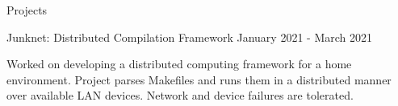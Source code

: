\documentclass{resume} %
\begin{document}
\begin{resumeSection}{Projects}
\begin{resumeSubsection}{Junknet: Distributed Compilation Framework}
	{January 2021 - March 2021}{}{}
\item Worked on developing a distributed computing framework for a home
	environment. Project parses Makefiles and runs them in a distributed
	manner over available LAN devices. Network and device failures are
	tolerated.
\end{resumeSubsection}

\end{resumeSection}
\end{document}
